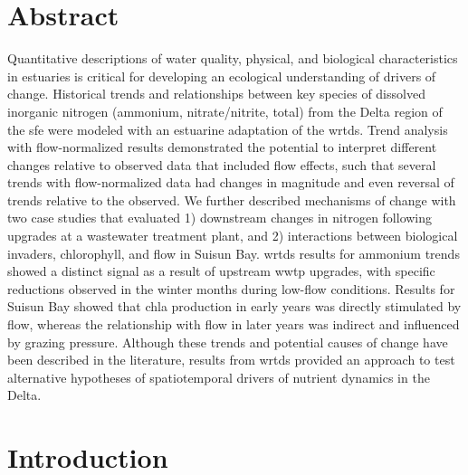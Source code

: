 \documentclass[letterpaper,12pt,oneside]{article}\usepackage[]{graphicx}\usepackage[]{color}
\begin{document}
\section*{Abstract}
\noindent Quantitative descriptions of water quality, physical, and biological characteristics in estuaries is critical for developing an ecological understanding of drivers of change.  Historical trends and relationships between key species of dissolved inorganic nitrogen (ammonium, nitrate/nitrite, total) from the Delta region of the \ac{sfe} were modeled with an estuarine adaptation of the \ac{wrtds}.  Trend analysis with flow-normalized results demonstrated the potential to interpret different changes relative to observed data that included flow effects, such that several trends with flow-normalized data had changes in magnitude and even reversal of trends relative to the observed.  We further described mechanisms of change with two case studies that evaluated 1) downstream changes in nitrogen following upgrades at a wastewater treatment plant, and 2) interactions between biological invaders, chlorophyll, and flow in Suisun Bay.  \ac{wrtds} results for ammonium trends showed a distinct signal as a result of upstream \ac{wwtp} upgrades, with specific reductions observed in the winter months during low-flow conditions. Results for Suisun Bay showed that \ac{chla} production in early years was directly stimulated by flow, whereas the relationship with flow in later years was indirect and influenced by grazing pressure. Although these trends and potential causes of change have been described in the literature, results from \ac{wrtds} provided an approach to test alternative hypotheses of spatiotemporal drivers of nutrient dynamics in the Delta.
\acresetall

\section{Introduction}
\end{document}
